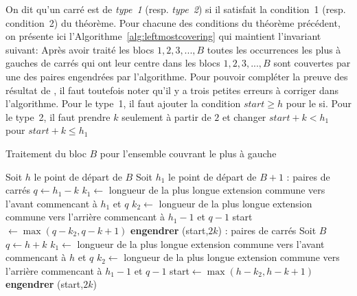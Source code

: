 \documentclass[10pt,letterpaper,oneside]{article}
\begin{document}
On dit qu'un carré est de  \emph{type~1} (resp. \emph{type~2}) si il satisfait la condition~1 (resp. condition~2) du théorème. Pour chacune des conditions du théorème précédent, on présente ici l'Algorithme~\ref{alg:leftmostcovering} qui maintient l'invariant suivant: Après avoir traité les blocs $1,2,3,...,B$ toutes les occurrences les plus à gauches de carrés qui ont leur centre dans les blocs $1,2,3,...,B$ sont couvertes par une des paires engendrées par l'algorithme. Pour pouvoir compléter la preuve des résultat de \cite{MR2096375}, il faut toutefois noter qu'il y a trois petites erreurs à corriger dans l'algorithme. Pour le type~1, il faut ajouter la condition $start\geq h$ pour le si. Pour le type~2, il faut prendre $k$ seulement à partir de $2$ et changer $start+k<h_1$ pour $start+k\leq h_1$
\begin{algorithm}[htb]
    \centering
    \caption{Traitement du bloc $B$ pour l'ensemble couvrant le plus à gauche}
    \label{alg:leftmostcovering}
    \vspace{10pt}
    \begin{algorithmic}[1]
        \State Soit $h$ le point de départ de $B$
        \State Soit $h_1$ le point de départ de $B+1$
         : paires de carrés
                \State $q\gets h_1-k$
                \State $k_1\gets$ longueur de la plus longue extension commune vers l'avant commencant à $h_1$ et $q$
                \State $k_2\gets$ longueur de la plus longue extension commune vers l'arrière commencant à $h_1-1$ et $q-1$
                \State start$\gets \max(q-k_2,q-k+1)$
                    \State \textbf{engendrer} (start,$2k$)
                \EndIf
            \EndFor
        \EndFunction
        \State
        : paires de carrés
            \State Soit $B$
                \State $q\gets h+k$
                \State $k_1\gets$ longueur de la plus longue extension commune vers l'avant commencant à $h$ et $q$
                \State $k_2\gets$ longueur de la plus longue extension commune vers l'arrière commencant à $h_1-1$ et $q-1$
                \State start$\gets \max(h-k_2,h-k+1)$
                        \State \textbf{engendrer} (start,$2k$)
                    \EndIf
            \EndFor
        \EndFunction
    \end{algorithmic}
\end{algorithm}
\end{document}

